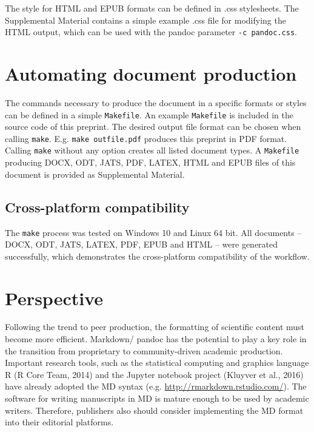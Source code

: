 \documentclass[10pt,fleqn]{wlpeerj}
\begin{document}
The style for HTML and EPUB formats can be defined in .css stylesheets.
The Supplemental Material contains a simple example .css file for
modifying the HTML output, which can be used with the pandoc parameter
\texttt{-c\ pandoc.css}.

\section{Automating document
production}\label{automating-document-production}

The commands necessary to produce the document in a specific formats or
styles can be defined in a simple \texttt{Makefile}. An example
\texttt{Makefile} is included in the source code of this preprint. The
desired output file format can be chosen when calling \texttt{make}.
E.g. \texttt{make\ outfile.pdf} produces this preprint in PDF format.
Calling \texttt{make} without any option creates all listed document
types. A \texttt{Makefile} producing DOCX, ODT, JATS, PDF, LATEX, HTML
and EPUB files of this document is provided as Supplemental Material.

\subsection{Cross-platform
compatibility}\label{cross-platform-compatibility}

The \texttt{make} process was tested on Windows 10 and Linux 64 bit. All
documents -- DOCX, ODT, JATS, LATEX, PDF, EPUB and HTML -- were
generated successfully, which demonstrates the cross-platform
compatibility of the workflow.

\section{Perspective}\label{perspective}

Following the trend to peer production, the formatting of scientific
content must become more efficient. Markdown/ pandoc has the potential
to play a key role in the transition from proprietary to
community-driven academic production. Important research tools, such as
the statistical computing and graphics language R (R Core Team, 2014)
and the Jupyter notebook project (Kluyver et al., 2016) have already
adopted the MD syntax (e.g. \url{http://rmarkdown.rstudio.com/}). The
software for writing manuscripts in MD is mature enough to be used by
academic writers. Therefore, publishers also should consider
implementing the MD format into their editorial platforms.
\end{document}
